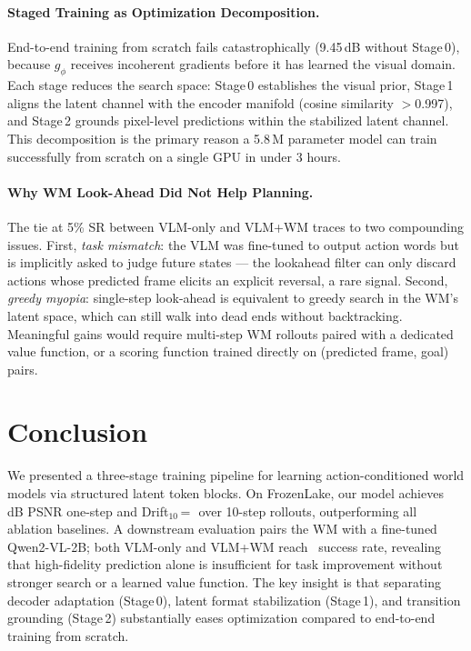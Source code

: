 \documentclass[11pt]{article}
\begin{document}
\paragraph{Staged Training as Optimization Decomposition.}
End-to-end training from scratch fails catastrophically (9.45\,dB without Stage\,0),
because $g_\phi$ receives incoherent gradients before it has learned the visual domain.
Each stage reduces the search space: Stage\,0 establishes the visual prior,
Stage\,1 aligns the latent channel with the encoder manifold (cosine similarity $>$0.997),
and Stage\,2 grounds pixel-level predictions within the stabilized latent channel.
This decomposition is the primary reason a 5.8\,M parameter model can train
successfully from scratch on a single GPU in under 3 hours.

\paragraph{Why WM Look-Ahead Did Not Help Planning.}
\label{sec:discussion}
The tie at 5\% SR between VLM-only and VLM+WM traces to two compounding issues.
First, \emph{task mismatch}: the VLM was fine-tuned to output action words but is
implicitly asked to judge future states --- the lookahead filter can only discard
actions whose predicted frame elicits an explicit reversal, a rare signal.
Second, \emph{greedy myopia}: single-step look-ahead is equivalent to greedy search
in the WM's latent space, which can still walk into dead ends without backtracking.
Meaningful gains would require multi-step WM rollouts paired with a dedicated value
function, or a scoring function trained directly on (predicted frame, goal) pairs.

\section{Conclusion}

We presented a three-stage training pipeline for learning action-conditioned
world models via structured latent token blocks.
On FrozenLake, our model achieves \MAINPSNR\,dB PSNR one-step and
Drift$_{10}$\,=\,\MAINDRIFTX\ over 10-step rollouts, outperforming all ablation
baselines.
A downstream evaluation pairs the WM with a fine-tuned Qwen2-VL-2B;
both VLM-only and VLM+WM reach \PLANVLMSR\ success rate, revealing that
high-fidelity prediction alone is insufficient for task improvement without
stronger search or a learned value function.
The key insight is that separating decoder adaptation (Stage\,0), latent format
stabilization (Stage\,1), and transition grounding (Stage\,2) substantially
eases optimization compared to end-to-end training from scratch.
\end{document}

